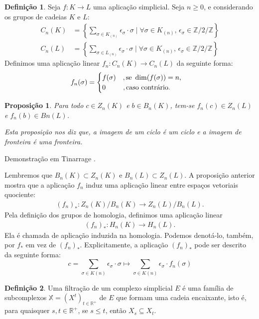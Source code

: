 \documentclass[12pt, a4paper]{article}
\theoremstyle{plain}
\newtheorem{proposition}{Proposição}[section]
\theoremstyle{definition}
\newtheorem{definition}{Definição}[section]
\theoremstyle{remark}
\begin{document}
\begin{definition}
    Seja $f:K\to L$ uma aplicação simplicial. Seja $n\geq0$, e considerando os grupos de cadeias $K$ e $L$:
    \begin{align*}
        C_n(K) &= \left\{\sum_{\sigma \in K_{(n)}} \epsilon_\sigma \cdot \sigma \mid \forall\sigma \in  K_{(n)}, \, \epsilon_\sigma \in \mathbb{Z}/2/\mathbb{Z}  \right\}\\
        C_n(L) &= \left\{\sum_{\sigma \in L_{(n)}} \epsilon_\sigma \cdot \sigma \mid \forall\sigma \in  K_{(n)}, \, \epsilon_\sigma \in \mathbb{Z}/2/\mathbb{Z}  \right\}
    \end{align*}
    Definimos uma aplicação linear $f_n: C_n(K) \to C_n(L)$ da seguinte forma:
    \[
    f_n (\sigma) =
    \begin{cases}
        f(\sigma) \quad, \textnormal{se} \,\, \dim (f(\sigma)) = n,\\
        0 \quad\quad\,\,\,, \textnormal{caso contrário}.
    \end{cases}
    \]
\end{definition}

\begin{proposition}
    Para todo $c \in Z_n(K)$ e $b \in B_n(K)$, tem-se $f_n(c) \in Z_n(L)$ e $f_n(b) \in
Bn(L)$.

Esta proposição nos diz que, a imagem de um ciclo é um ciclo e a imagem de fronteira é uma fronteira.
\end{proposition}
\vspace{-0.6em}
Demonstração em Tinarrage \cite{tinarrage2021}.

Lembremos que $B_n(K) \subset Z_n(K)$ e $B_n(L) \subset Z_n(L)$. A proposição anterior mostra que a aplicação $f_n$ induz uma aplicação linear entre
espaços vetoriais quociente:
\begin{align*}
    (f_n)_* : Z_n(K)/B_n(K) \longrightarrow Z_n(L)/B_n(L).
\end{align*}
Pela definição dos grupos de homologia, definimos uma aplicação linear
\begin{align*}
    (f_n)_* : H_n(K) \longrightarrow H_n(L).
\end{align*}
Ela é chamada de aplicação induzida na homologia. Podemos denotá-lo, também, por $f_*$ em vez de $(f_n)_*$. Explicitamente, a aplicação $(f_n)_*$ pode ser descrito da seguinte forma:
\[
c = \sum_{\sigma \in K(n)} \epsilon_\sigma \cdot \sigma \longmapsto \sum_{\sigma \in K(n)} \epsilon_\sigma \cdot f_n(\sigma)
\]

\begin{definition}
    Uma filtração de um complexo simplicial $E$ é uma família de subcomplexos $\mathbb{X} = (X^t)_{t \in \mathbb{R}^+}$ de $E$ que formam uma cadeia encaixante, isto é, para quaisquer $s, t \in \mathbb{R}^+$, se $s \leq t$, então $X_s \subseteq X_t$.
\end{definition}
\end{document}
